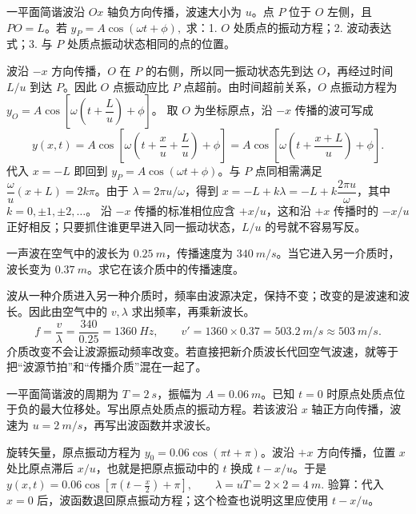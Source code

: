 \documentclass[lang=cn,11pt]{elegantbook}
\begin{document}
\begin{exercise}
一平面简谐波沿 \(Ox\) 轴负方向传播，波速大小为 \(u\)。点 \(P\) 位于 \(O\) 左侧，且 \(PO=L\)。若
 \(y_P=A\cos(\omega t+\phi),\) 
求：1. \(O\) 处质点的振动方程；2. 波动表达式；3. 与 \(P\) 处质点振动状态相同的点的位置。
\end{exercise}

\begin{solution}
波沿 \(-x\) 方向传播，\(O\) 在 \(P\) 的右侧，所以同一振动状态先到达 \(O\)，再经过时间 \(L/u\) 到达 \(P\)。因此 \(O\) 点振动应比 \(P\) 点超前。由时间超前关系，\(O\) 点振动方程为 \(y_O=A\cos\left[\omega\left(t+\dfrac{L}{u}\right)+\phi\right]\)。
取 \(O\) 为坐标原点，沿 \(-x\) 传播的波可写成
\[
y(x,t)=A\cos\left[\omega\left(t+\frac{x}{u}+\frac{L}{u}\right)+\phi\right]
=A\cos\left[\omega\left(t+\frac{x+L}{u}\right)+\phi\right].
\]
代入 \(x=-L\) 即回到 \(y_P=A\cos(\omega t+\phi)\)。与 \(P\) 点同相需满足 \(\dfrac{\omega}{u}(x+L)=2k\pi\)。由于 \(\lambda=2\pi u/\omega\)，得到 \(x=-L+k\lambda=-L+k\dfrac{2\pi u}{\omega}\)，其中 \(k=0,\pm1,\pm2,\dots\)。
沿 \(-x\) 传播的标准相位应含 \(+x/u\)，这和沿 \(+x\) 传播时的 \(-x/u\) 正好相反；只要抓住谁更早进入同一振动状态，\(L/u\) 的号就不容易写反。
\end{solution}

\begin{exercise}
一声波在空气中的波长为 \(\SI{0.25}{m}\)，传播速度为 \(\SI{340}{m/s}\)。当它进入另一介质时，波长变为 \(\SI{0.37}{m}\)。求它在该介质中的传播速度。
\end{exercise}

\begin{solution}
波从一种介质进入另一种介质时，频率由波源决定，保持不变；改变的是波速和波长。因此由空气中的 \(v,\lambda\) 求出频率，再乘新波长。
\[
f=\frac{v}{\lambda}=\frac{340}{0.25}=\SI{1360}{Hz},\qquad
v'=1360\times0.37=\SI{503.2}{m/s}\approx\SI{503}{m/s}.
\]
介质改变不会让波源振动频率改变。若直接把新介质波长代回空气波速，就等于把“波源节拍”和“传播介质”混在一起了。
\end{solution}

\begin{exercise}
一平面简谐波的周期为 \(T=\SI{2}{s}\)，振幅为 \(A=\SI{0.06}{m}\)。已知 \(t=0\) 时原点处质点位于负的最大位移处。写出原点处质点的振动方程。若该波沿 \(x\) 轴正方向传播，波速为 \(u=\SI{2}{m/s}\)，再写出波函数并求波长。
\end{exercise}
\begin{solution}
旋转矢量，原点振动方程为 \(y_0=0.06\cos(\pi t+\pi)\)。波沿 \(+x\) 方向传播，位置 \(x\) 处比原点滞后 \(x/u\)，也就是把原点振动中的 \(t\) 换成 \(t-x/u\)。于是
 \(y(x,t)=0.06\cos\left[\pi\left(t-\frac{x}{2}\right)+\pi\right], \qquad \lambda=uT=2\times2=\SI{4}{m}.\) 
验算：代入 \(x=0\) 后，波函数退回原点振动方程；这个检查也说明这里应使用 \(t-x/u\)。
\end{solution}
\end{document}
